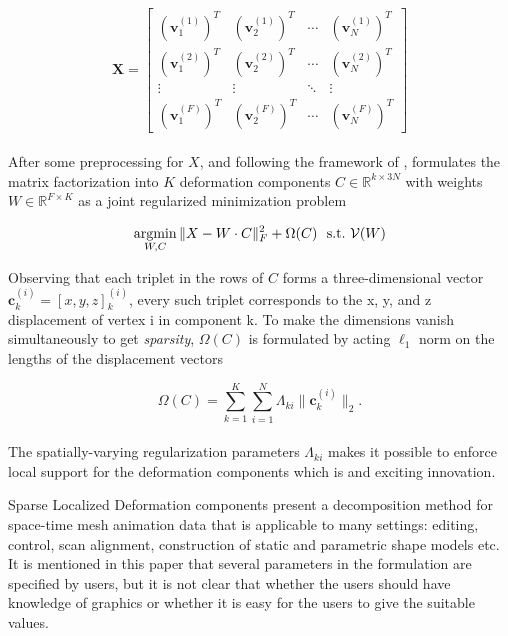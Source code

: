 \small{
\begin{equation}
 \label{eq:edgecotanoperator}
 \mathbf{X} = {\left[ \begin{array}{cccc}
 (\mathbf{v}{_1^{(1)}})^{T} & (\mathbf{v}{_2^{(1)}})^{T} & \cdots & (\mathbf{v}{_{N}^{(1)}})^{T}\\
 (\mathbf{v}{_1^{(2)}})^{T} & (\mathbf{v}{_2^{(2)}})^{T} & \cdots & (\mathbf{v}{_{N}^{(2)}})^{T}\\
 \vdots & \vdots & \ddots & \vdots\\
 (\mathbf{v}{_1^{(F)}})^{T} & (\mathbf{v}{_2^{(F)}})^{T} & \cdots & (\mathbf{v}{_{N}^{(F)}})^{T}
 \end{array}
 \right]}
\end{equation}
}
\\
After some preprocessing for $X$, and following the framework of \cite{zou2006sparse},
\cite{neumann2013sparse} formulates the matrix factorization into $K$ deformation components $C\in \mathbb{R}^{k\times 3N}$ with weights
$W\in \mathbb{R}^{F\times K}$ as a joint regularized minimization problem

\small{
\begin{equation}
 \label{eq:sparselocal}
 \mathop{\operatorname*{argmin}}_{W,C}\|X-W\cdot C\|{_{F}^2}+\Omega(C)~~\textrm{s.t.}~\mathcal{V}(W)
\end{equation}
}

Observing that each triplet in the rows of $C$ forms a three-dimensional vector $\mathbf{c}{_{k}^{(i)}}=[x,y,z]{_{k}^{(i)}}$,
every such triplet corresponds to the x, y, and z displacement of vertex i in component k.
To make the dimensions vanish simultaneously to get \textit{sparsity}, $\Omega(C)$ is formulated by acting $\ell_1$ norm on the lengths of the displacement vectors

\small{
\begin{equation}
 \label{eq:sparselocal}
 \Omega(C)=\sum_{k=1}^{K}\sum_{i=1}^{N}\Lambda_{ki}\|\mathbf{c}{_{k}^{(i)}}\|_2.
\end{equation}
}
\\
The spatially-varying regularization parameters $\Lambda_{ki}$ makes it possible to enforce local support for the deformation components which is and exciting innovation.

Sparse Localized Deformation components present a decomposition method for space-time mesh animation data that is applicable to many settings: editing, control, scan alignment, construction of static and parametric shape models etc.
It is mentioned in this paper that several parameters in the formulation are specified by users,
but it is not clear that whether the users should have knowledge of graphics or whether it is easy for the users to give the suitable values.

